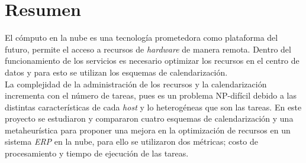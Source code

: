 \chapter*{Resumen}



El c\'omputo en la nube es una tecnolog\'ia prometedora como plataforma del futuro, permite el acceso a recursos de  \textit{hardware} de manera remota. Dentro del funcionamiento de los servicios es necesario optimizar los recursos en el centro de datos y para esto se utilizan los esquemas de calendarizaci\'on.\\ La complejidad de la administraci\'on de los recursos y la calendarizaci\'on incrementa con el n\'umero de tareas, pues es un problema NP-dif\'icil debido a las distintas caracter\'isticas de cada \textit{host} y lo heterog\'eneas que son las tareas.
En este proyecto se estudiaron y compararon cuatro esquemas de calendarizaci\'on y una metaheurística para proponer una mejora en la optimizaci\'on de recursos en un sistema \textit{ERP} en la nube, para ello se utilizaron dos m\'etricas; costo de procesamiento y tiempo de ejecuci\'on de las tareas.



